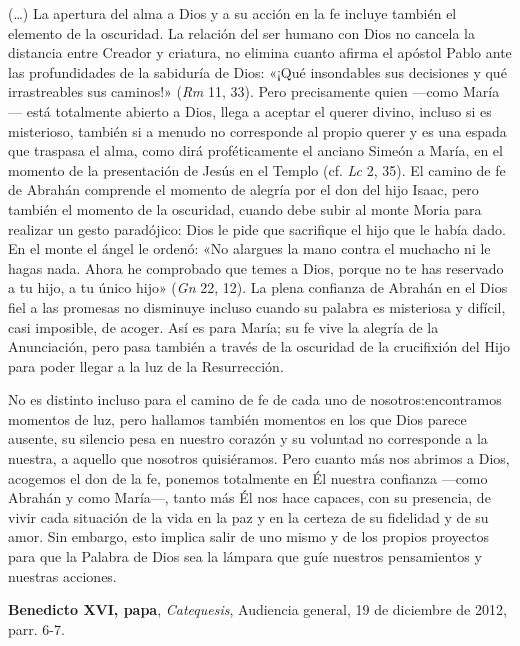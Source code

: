 \begin{patercite}
(\ldots) La apertura del alma a Dios y a su acción en la fe incluye también el elemento de la oscuridad. La relación del ser humano con Dios no cancela la distancia entre Creador y criatura, no elimina cuanto afirma el apóstol Pablo ante las profundidades de la sabiduría de Dios: «¡Qué insondables sus decisiones y qué irrastreables sus caminos!» (\emph{Rm} 11, 33). Pero precisamente quien ---como María--- está totalmente abierto a Dios, llega a aceptar el querer divino, incluso si es misterioso, también si a menudo no corresponde al propio querer y es una espada que traspasa el alma, como dirá proféticamente el anciano Simeón a María, en el momento de la presentación de Jesús en el Templo (cf. \emph{Lc} 2, 35). El camino de fe de Abrahán comprende el momento de alegría por el don del hijo Isaac, pero también el momento de la oscuridad, cuando debe subir al monte Moria para realizar un gesto paradójico: Dios le pide que sacrifique el hijo que le había dado. En el monte el ángel le ordenó: «No alargues la mano contra el muchacho ni le hagas nada. Ahora he comprobado que temes a Dios, porque no te has reservado a tu hijo, a tu único hijo» (\emph{Gn} 22, 12). La plena confianza de Abrahán en el Dios fiel a las promesas no disminuye incluso cuando su palabra es misteriosa y difícil, casi imposible, de acoger. Así es para María; su fe vive la alegría de la Anunciación, pero pasa también a través de la oscuridad de la crucifixión del Hijo para poder llegar a la luz de la Resurrección.

No es distinto incluso para el camino de fe de cada uno de nosotros:encontramos momentos de luz, pero hallamos también momentos en los que Dios parece ausente, su silencio pesa en nuestro corazón y su voluntad no corresponde a la nuestra, a aquello que nosotros quisiéramos. Pero cuanto más nos abrimos a Dios, acogemos el don de la fe, ponemos totalmente en Él nuestra confianza ---como Abrahán y como María---, tanto más Él nos hace capaces, con su presencia, de vivir cada situación de la vida en la paz y en la certeza de su fidelidad y de su amor. Sin embargo, esto implica salir de uno mismo y de los propios proyectos para que la Palabra de Dios sea la lámpara que guíe nuestros pensamientos y nuestras acciones.
	
	\textbf{Benedicto XVI, papa}, \textit{Catequesis}, Audiencia general,  19 de diciembre de 2012, parr. 6-7.
\end{patercite}

\label{b2-03-02-2012H}
\newpage

